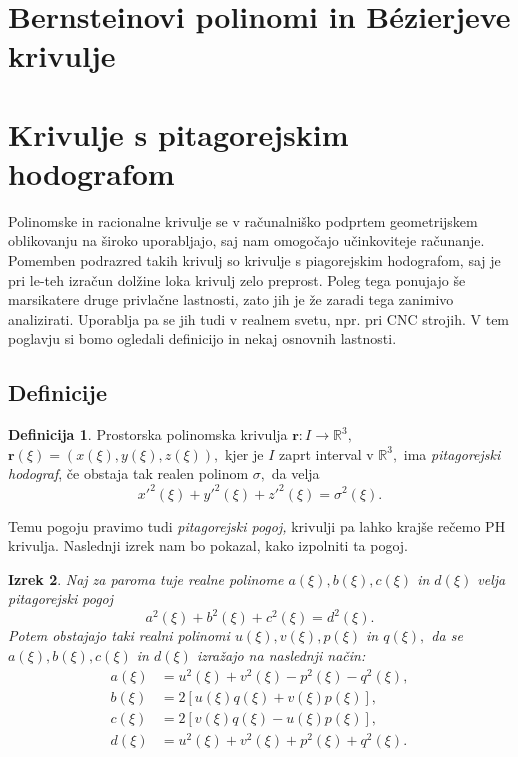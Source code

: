 \documentclass[12pt,a4paper,twoside]{article}
\theoremstyle{definition} %
\newtheorem{definicija}{Definicija}[section]
\theoremstyle{plain} %
\newtheorem{izrek}[definicija]{Izrek}
\numberwithin{equation}{section}  %
\newcommand{\R}{\mathbb R}
\begin{document}
\section{Bernsteinovi polinomi in Bézierjeve krivulje}
\section{Krivulje s pitagorejskim hodografom}

Polinomske in racionalne krivulje se v računalniško podprtem geometrijskem oblikovanju na široko uporabljajo, saj nam omogočajo učinkoviteje računanje. Pomemben podrazred takih krivulj so krivulje s piagorejskim hodografom, saj je pri le-teh izračun dolžine loka krivulj zelo preprost. Poleg tega ponujajo še marsikatere druge privlačne lastnosti, zato jih je že zaradi tega zanimivo analizirati. Uporablja pa se jih tudi v realnem svetu, npr. pri CNC strojih. V tem poglavju si bomo ogledali definicijo in nekaj osnovnih lastnosti.

\subsection{Definicije}

\begin{definicija}
	Prostorska polinomska krivulja $\mathbf{r}:I \to \R^3,$ $\mathbf{r}(\xi)=(x(\xi),y(\xi),z(\xi)),$ kjer je $I$ zaprt interval v $\R^3,$ ima \emph{pitagorejski hodograf}, če obstaja tak realen polinom $\sigma,$ da velja
	\begin{equation}
		\label{pitagorejski}
		x'^2(\xi)+y'^2(\xi)+z'^2(\xi)=\sigma^2(\xi).
	\end{equation}
\end{definicija}

Temu pogoju pravimo tudi \emph{pitagorejski pogoj,} krivulji pa lahko krajše rečemo PH krivulja. Naslednji izrek nam bo pokazal, kako izpolniti ta pogoj.

\begin{izrek}
	Naj za paroma tuje realne polinome $a(\xi),b(\xi),c(\xi)$ in $d(\xi)$ velja pitagorejski pogoj
	\begin{equation}
		\label{pogoj_izrek4_2}
		a^2(\xi)+b^2(\xi)+c^2(\xi)=d^2(\xi).
	\end{equation}
	Potem obstajajo taki realni polinomi $u(\xi),v(\xi),p(\xi)$ in $q(\xi),$ da se $a(\xi),b(\xi),c(\xi)$ in $d(\xi)$ izražajo na naslednji način:
	\begin{align}
		a(\xi)&=u^2(\xi)+v^2(\xi)-p^2(\xi)-q^2(\xi), \nonumber \\
		b(\xi)&=2[u(\xi)q(\xi)+v(\xi)p(\xi)], \nonumber \\
		c(\xi)&=2[v(\xi)q(\xi)-u(\xi)p(\xi)], \nonumber \\
		d(\xi)&=u^2(\xi)+v^2(\xi)+p^2(\xi)+q^2(\xi). \label{izrek4_3}
	\end{align}
\end{izrek}
\end{document}
